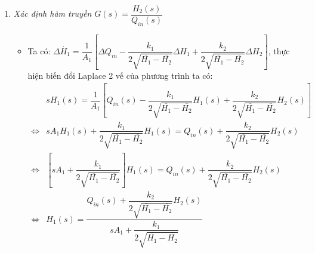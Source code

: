 \begin{enumerate}[\it a.]
            \item \textit{Xác định hàm truyền $G(s) = \dfrac{H_2(s)}{Q_{in}(s)}$}
                \begin{itemize}
                    \item Ta có: $\Delta \dot{H_1} = \dfrac{1}{A_1} \left[{\Delta Q_{in} - \dfrac{k_1}{2\sqrt{\overline{H_1} - \overline{H_2}}} \Delta H_1 + \dfrac{k_2}{2\sqrt{\overline{H_1} - \overline{H_2}}} \Delta H_2}\right]$, thực hiện biến đổi Laplace 2 vế của phương trình ta có:
                        \begin{align}
                            & s H_1(s) = \dfrac{1}{A_1} \left[{Q_{in}(s) - \dfrac{k_1}{2\sqrt{\overline{H_1} - \overline{H_2}}} H_1(s) + \dfrac{k_2}{2\sqrt{\overline{H_1} - \overline{H_2}}} H_2(s)}\right]\\
                            \Longleftrightarrow & s A_1 H_1(s) + \dfrac{k_1}{2\sqrt{\overline{H_1} - \overline{H_2}}} H_1(s) = Q_{in}(s) + \dfrac{k_2}{2\sqrt{\overline{H_1} - \overline{H_2}}} H_2(s)\\
                            \Longleftrightarrow & \left[{s A_1 + \dfrac{k_1}{2\sqrt{\overline{H_1} - \overline{H_2}}}}\right] H_1(s) = Q_{in}(s) + \dfrac{k_2}{2\sqrt{\overline{H_1} - \overline{H_2}}} H_2(s) \\
                            \Longleftrightarrow & H_1(s) = \dfrac{Q_{in}(s) + \dfrac{k_2}{2\sqrt{\overline{H_1} - \overline{H_2}}} H_2(s)}{s A_1 + \dfrac{k_1}{2\sqrt{\overline{H_1} - \overline{H_2}}}}
                        \end{align}


\end{itemize}
\end{enumerate}
